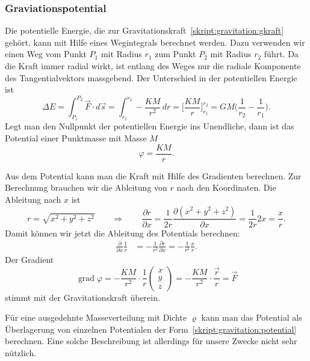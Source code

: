 \subsubsection{Graviationspotential}
Die potentielle Energie, die zur
Gravitationskraft~\eqref{skript:gravitation:gkraft} gehört, kann
mit Hilfe eines Wegintegrals berechnet werden.
Dazu verwenden wir einen Weg vom Punkt $P_1$ mit Radius $r_1$
zum Punkt $P_2$ mit Radius $r_2$ führt.
Da die Kraft immer radial wirkt, ist entlang des Weges nur die radiale
Komponente des Tangentialvektors massgebend.
Der Unterschied in der potentiellen Energie ist
\[
\Delta E
=
\int_{P_1}^{P_2} \vec F\cdot d\vec s
=
\int_{r_1}^{r_2} -\frac{KM}{r^2}\,dr
=
\biggl[
\frac{KM}{r}
\biggr]_{r_1}^{r_2}
=
GM\biggl(\frac{1}{r_2}-\frac{1}{r_1}\biggr).
\]
Legt man den Nullpunkt der potentiellen Energie ins Unendliche, dann ist
das Potential einer Punktmasse mit Masse $M$
\begin{equation}
\varphi = \frac{KM}{r}.
\label{skript:gravitation:potential}
\end{equation}

Aus dem Potential kann man die Kraft mit Hilfe des Gradienten
berechnen.
Zur Berechnung brauchen wir die Ableitung von $r$ nach den Koordinaten.
Die Ableitung nach $x$ ist
\[
r=\sqrt{x^2+y^2+z^2}
\qquad\Rightarrow\qquad
\frac{\partial r}{\partial x}
=
\frac{1}{2r} \frac{\partial (x^2+y^2+z^2)}{\partial x}
=
\frac{1}{2r} 2x=\frac{x}{r}.
\]
Damit können wir jetzt die Ableitung des Potentials berechnen:
\begin{align*}
\frac{\partial}{\partial x}\frac1{r}
&=
-\frac{1}{r^2} \frac{\partial r}{\partial x}
=
-\frac{1}{r^2} \frac{x}{r}.
\end{align*}
Der Gradient
\[
\operatorname{grad}\varphi
=
-\frac{KM}{r^2}\cdot\frac1r\begin{pmatrix}x\\y\\z\end{pmatrix}
=
-\frac{KM}{r^2}\cdot\frac{\vec r}{r} = \vec F
\]
stimmt mit der Gravitationskraft überein.

Für eine ausgedehnte Masseverteilung mit Dichte $\varrho$ kann man das
Potential als Überlagerung von einzelnen Potentialen der
Form~\eqref{skript:gravitation:potential} berechnen.
Eine solche Beschreibung
ist allerdings für unsere Zwecke nicht sehr nützlich.


